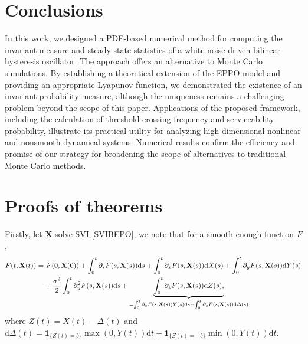 \documentclass[12pt]{article}
\numberwithin{equation}{section}
\def\d{\mathrm{d}}
\newcommand{\indic}{\mathbf{1}}
\begin{document}
\section{Conclusions}\label{sec:conclusions}
In this work, we designed a PDE-based numerical method for computing the invariant measure 
and steady-state statistics of a white-noise-driven bilinear hysteresis oscillator. 
The approach offers an alternative to Monte Carlo simulations. 
By establishing a theoretical extension of the EPPO model and 
providing an appropriate Lyapunov function, 
we demonstrated the existence of an invariant probability measure, 
although the uniqueness remains a challenging problem beyond the scope of this paper. 
Applications of the proposed framework, 
including the calculation of threshold crossing frequency and serviceability probability, 
illustrate its practical utility for analyzing high-dimensional nonlinear and nonsmooth dynamical systems. 
Numerical results confirm the efficiency and promise of our strategy 
for broadening the scope of alternatives to traditional Monte Carlo methods.

\appendix
\section{Proofs of theorems}\label{app-A01}

\renewcommand{\thecorollary}{A.\arabic{corollary}}
\renewcommand{\theequation}{A.\arabic{equation}}
\setcounter{figure}{0}
\renewcommand{\thefigure}{A-\arabic{figure}}
\renewcommand{\thetheorem}{A.\arabic{theorem}}
\renewcommand{\thelemma}{A.\arabic{lemma}}


Firstly, let $\mathbf{X}$ solve SVI \eqref{SVIBEPO}, 
we note that for a smooth enough function $F$, 
\begin{align}
	F(t, \mathbf{X}(t))
	=& ~F(0, \mathbf{X}(0))
	+ \int_0^t \partial_s F(s, \mathbf{X}(s)) \d s
	+ \int_0^t \partial_x F(s,\mathbf{X}(s)) \d X(s)
	+ \int_0^t \partial_y F(s,\mathbf{X}(s)) \d Y(s) \label{Ito-formula}\\
	&+ \frac{\sigma^2}{2}\int_0^t \partial^{2}_{y} F(s,\mathbf{X}(s)) \d s
	+ \underbrace{\int_0^t \partial_z F(s,\mathbf{X}(s)) \d Z(s),}
	_{=\int_0^t \partial_z F(s,\mathbf{X}(s)) Y(s) \mathrm{d} s 
		- \int_0^t \partial_z F(s,\mathbf{X}(s)) \mathrm{d} \Delta(s)}\notag
\end{align}
where $Z(t) = X(t) - \Delta(t)$ and 
$\d\Delta(t) = \indic_{\{Z(t) = b\}} \max(0, Y(t)) \d t + \indic_{\{Z(t) = -b\}} \min(0, Y(t)) \d t$. 
\end{document}
